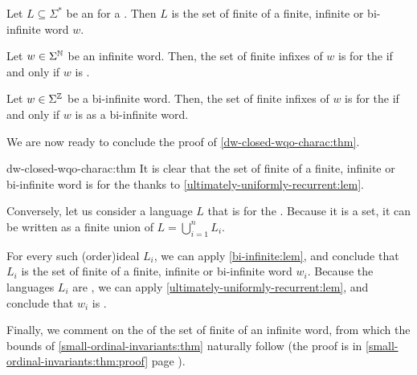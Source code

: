 \begin{lemma}
    \label{bi-infinite:lem}
    Let $L \subseteq \Sigma^*$ be an  
    for a  
    . Then $L$ is the set of finite 
    of a finite, infinite or bi-infinite word $w$.
\end{lemma}

\begin{lemma}
    \label{ultimately-uniformly-recurrent:lem}
    Let $w \in \Sigma^{\mathbb{N}}$ be an infinite word. 
    Then, the set of finite infixes of $w$ is  for the 
    if and only if $w$ is .
\end{lemma}

\begin{lemma}
  \label{bi-infinite-uur:lem}
    Let $w \in \Sigma^{\mathbb{Z}}$ be a bi-infinite word. Then, the set of finite
    infixes of $w$ is  for the  if
    and only if $w$ is  as a bi-infinite word.
\end{lemma}

We are now ready to conclude the proof of \cref{dw-closed-wqo-charac:thm}.

\begin{proofof}{dw-closed-wqo-charac:thm}
  It is clear that the set of finite  of a finite, infinite or
  bi-infinite  word is 
  for the  thanks to \cref{ultimately-uniformly-recurrent:lem}.

  Conversely, let us consider a  language $L$ that is
   for the . Because it is a
   set, it can be written as a finite union of  $L = \bigcup_{i = 1}^n L_i$.

  For every such \kl(order){ideal} $L_i$, we can apply
  \cref{bi-infinite:lem}, and conclude that $L_i$ is the set of finite
   of a finite, infinite or bi-infinite word $w_i$. 
  Because the languages $L_i$ are , we can apply
  \cref{ultimately-uniformly-recurrent:lem}, and conclude that $w_i$ is
  .
\end{proofof}

Finally, we comment on the  of the set of finite
 of an  infinite word, from
which the bounds of \cref{small-ordinal-invariants:thm} naturally follow (the
proof is in \cref{small-ordinal-invariants:thm:proof} page
\pageref{small-ordinal-invariants:thm:proof}).


